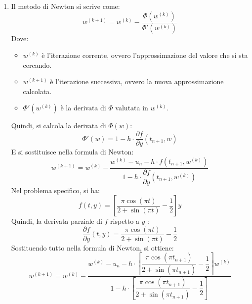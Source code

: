 \begin{itemize}
\begin{enumerate}
        \item Il metodo di Newton si scrive come:
        \begin{equation*}
            w^{\left(k+1\right)} = w^{\left(k\right)} - \dfrac{\Phi\left(w^{\left(k\right)}\right)}{\Phi'\left(w^{\left(k\right)}\right)}
        \end{equation*}
        Dove:
        \begin{itemize}
            \item $w^{(k)}$ è l'iterazione corrente, ovvero l'approssimazione del valore che si sta cercando.
            \item $w^{(k+1)}$ è l'iterazione successiva, ovvero la nuova approssimazione calcolata.
            \item $\Phi'(w^{(k)})$ è la derivata di $\Phi$ valutata in $w^{(k)}$.
        \end{itemize}
        Quindi, si calcola la derivata di $\Phi(w)$:
        \begin{equation*}
            \Phi'(w) = 1 - h \cdot \dfrac{\partial f}{\partial y}(t_{n+1}, w)
        \end{equation*}
        E si sostituisce nella formula di Newton:
        \begin{equation*}
            w^{\left(k+1\right)} = w^{\left(k\right)} - \dfrac{w^{\left(k\right)} - u_{n} - h \cdot f\left(t_{n+1}, w^{\left(k\right)}\right)}{1 - h \cdot \dfrac{\partial f}{\partial y}(t_{n+1}, w^{\left(k\right)})}
        \end{equation*}
        Nel problema specifico, si ha:
        \begin{equation*}
            f(t, y) = \left[\dfrac{\pi \cos\left(\pi t\right)}{2 + \sin\left(\pi t\right)} - \dfrac{1}{2}\right] y
        \end{equation*}
        Quindi, la derivata parziale di $f$ rispetto a $y$ \eaccent:
        \begin{equation*}
            \dfrac{\partial f}{\partial y}(t, y) = \dfrac{\pi \cos\left(\pi t\right)}{2 + \sin\left(\pi t\right)} - \dfrac{1}{2}
        \end{equation*}
        Sostituendo tutto nella formula di Newton, si ottiene:
        \begin{equation*}
            w^{\left(k+1\right)} = w^{\left(k\right)} - \dfrac{w^{\left(k\right)} - u_{n} - h \cdot \left[\dfrac{\pi \cos\left(\pi t_{n+1}\right)}{2 + \sin\left(\pi t_{n+1}\right)} - \dfrac{1}{2}\right] w^{\left(k\right)}}{1 - h \cdot \left[\dfrac{\pi \cos\left(\pi t_{n+1}\right)}{2 + \sin\left(\pi t_{n+1}\right)} - \dfrac{1}{2}\right]}

\end{equation*}
\end{enumerate}
\end{itemize}
